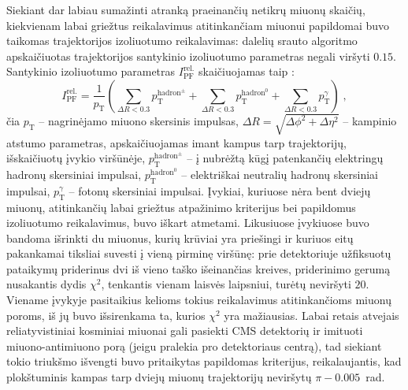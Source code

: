 \documentclass[a4paper, 12pt, oneside]{article}
\newcommand{\pT}{p_{\mathrm{T}}}
\newlength\q
\begin{document}
Siekiant dar labiau sumažinti atranką praeinančių netikrų miuonų skaičių, kiekvienam labai griežtus reikalavimus
atitinkančiam miuonui papildomai buvo taikomas trajektorijos izoliuotumo reikalavimas: dalelių srauto algoritmo
apskaičiuotas trajektorijos santykinio izoliuotumo parametras negali viršyti $0.15$.
Santykinio izoliuotumo parametras $I^{\mathrm{rel.}}_{\mathrm{PF}}$ skaičiuojamas taip \cite{ParticleFlow}:
\begin{equation}
	\label{eq:isolation}
	I^{\mathrm{rel.}}_{\mathrm{PF}} = \frac{1}{p_{\mathrm{T}}} 
	\left( \sum_{\Delta R<0.3} p_{\mathrm{T}}^{\mathrm{hadron^{\pm}}} +
	\sum_{\Delta R<0.3} p_{\mathrm{T}}^{\mathrm{hadron^0}} + 
	\sum_{\Delta R<0.3} p_{\mathrm{T}}^{\gamma} \right) \; \mathrm{,}
\end{equation}
čia $\pT$ -- nagrinėjamo miuono skersinis impulsas, $\Delta R = \sqrt{\Delta \phi^{2} + \Delta \eta^{2}}$ -- kampinio atstumo
parametras, apskaičiuojamas imant kampus tarp trajektorijų, išskaičiuotų įvykio viršūnėje, $p_{\mathrm{T}}^{\mathrm{hadron^{\pm}}}$
-- į nubrėžtą kūgį patenkančių elektringų hadronų skersiniai impulsai, $p_{\mathrm{T}}^{\mathrm{hadron^0}}$ -- elektriškai neutralių
hadronų skersiniai impulsai,  $p_{\mathrm{T}}^{\gamma}$ -- fotonų skersiniai impulsai.
Įvykiai, kuriuose nėra bent dviejų miuonų, atitinkančių labai griežtus atpažinimo kriterijus bei papildomus izoliuotumo
reikalavimus, buvo iškart atmetami.
Likusiuose įvykiuose buvo bandoma išrinkti du miuonus, kurių krūviai yra priešingi ir kuriuos eitų pakankamai tiksliai
suvesti į vieną pirminę viršūnę: prie detektoriuje užfiksuotų pataikymų priderinus dvi iš vieno taško išeinančias kreives,
priderinimo gerumą nusakantis dydis $\chi^2$, tenkantis vienam laisvės laipsniui, turėtų neviršyti $20$.
Viename įvykyje pasitaikius kelioms tokius reikalavimus atitinkančioms miuonų poroms, iš jų buvo išsirenkama ta, kurios
$\chi^2$ yra mažiausias.
Labai retais atvejais reliatyvistiniai kosminiai miuonai gali pasiekti CMS detektorių ir imituoti miuono-antimiuono porą
(jeigu pralekia pro detektoriaus centrą), tad siekiant tokio triukšmo išvengti buvo pritaikytas papildomas kriterijus,
reikalaujantis, kad plokštuminis kampas tarp dviejų miuonų trajektorijų neviršytų $\pi-0.005$~rad.
\end{document}
